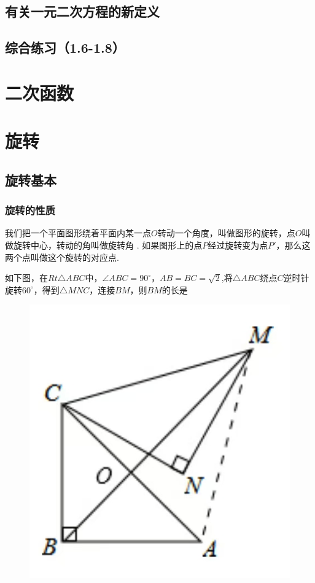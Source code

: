 \documentclass[lang=cn, 10pt, titlestyle=hang, oneside]{elegantbook}
\begin{document}
\section{有关一元二次方程的新定义}

\section{综合练习（1.6-1.8）}

\chapter{二次函数}

\chapter{旋转}

\section{旋转基本}

\subsection{旋转的性质}

我们把一个平面图形绕着平面内某一点\(O \)转动一个角度，叫做图形的旋转，点\(O \)叫做旋转中心，转动的角叫做旋转角 . 如果图形上的点\(P \)经过旋转变为点\(P' \)，那么这两个点叫做这个旋转的对应点.

\begin{example}
    如下图，在\(Rt\triangle ABC \)中，\(\angle ABC = 90^\circ \)，\(AB=BC=\sqrt{2}\),将\(\triangle ABC\)绕点\(C\)逆时针旋转\(60^\circ\)，得到\(\triangle MNC\)，连接\(BM\)，则\(BM\)的长是 \underline{\hspace{3em}}
    
\begin{figure}[h]
    \raggedright
    \includegraphics[width=0.25\linewidth]{figure/example_rotation1.jpg}
    
    \label{fig:enter-label}
\end{figure}
    
\end{example}
\end{document}
